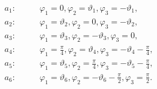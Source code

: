 \begin{equation}
\begin{aligned}
a_1: \qquad &
\varphi_1= 0,
\varphi_2=\vartheta_1,
\varphi_3=-\vartheta_1,\\
a_2: \qquad &
\varphi_1= \vartheta_2,
\varphi_2= 0,
\varphi_3=-\vartheta_2,\\
a_3: \qquad &
\varphi_1=\vartheta_3, 
\varphi_2=-\vartheta_3,
\varphi_3= 0,\\
a_4: \qquad &
\varphi_1=\frac{\pi}{4},
\varphi_2=\vartheta_4, 
\varphi_3=-\vartheta_4-\frac{\pi}{4},\\
a_5: \qquad &
\varphi_1=\vartheta_5,  
\varphi_2=\frac{\pi}{4},
\varphi_3=-\vartheta_5-\frac{\pi}{4},\\
a_6: \qquad &
\varphi_1= \vartheta_6,  
\varphi_2=-\vartheta_6-\frac{\pi}{2},
\varphi_3=\frac{\pi}{2}.
\end{aligned}\label{EqAngles6SUSYcases}
\end{equation}

